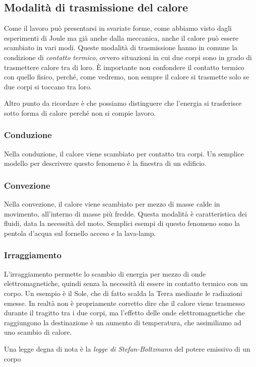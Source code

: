 \subsection*{Modalità di trasmissione del calore}
Come il lavoro può presentarsi in svariate forme, come abbiamo
visto dagli esperimenti di Joule ma già anche dalla meccanica,
anche il calore può essere scambiato in vari modi. Queste modalità
di trasmissione hanno in comune la condizione di \textit{contatto
termico}, ovvero situazioni in cui due corpi sono in grado di
trasmettere calore tra di loro. È importante non confondere il
contatto termico con quello fisico, perché, come vedremo, non
sempre il calore si trasmette solo se due corpi si toccano tra loro.

Altro punto da ricordare è che possiamo distinguere che l'energia
si trasferisce sotto forma di calore perché non si compie lavoro.

\subsubsection*{Conduzione}
Nella conduzione, il calore viene scambiato per contatto tra corpi.
Un semplice modello per descrivere questo fenomeno è la finestra di
un edificio.

\subsubsection*{Convezione}
Nella convezione, il calore viene scambiato per mezzo di masse calde
in movimento, all'interno di masse più fredde. Questa modalità è
caratteristica dei fluidi, data la necessità del moto. Semplici esempi
di questo fenomeno sono la pentola d'acqua sul fornello acceso e la
lava-lamp.

\subsubsection*{Irraggiamento}
L'irraggiamento permette lo scambio di energia per mezzo di onde
elettromagnetiche, quindi senza la necessità di essere in contatto
termico con un corpo. Un esempio è il Sole, che di fatto scalda la
Terra mediante le radiazioni emesse. In realtà non è propriamente
corretto dire che il calore viene trasmesso durante il tragitto tra
i due corpi, ma l'effetto delle onde elettromagnetiche che raggiungono
la destinazione è un aumento di temperatura, che assimiliamo ad uno
scambio di calore.

Una legge degna di nota è la \textit{legge di Stefan-Boltzmann} del
potere emissivo di un corpo

